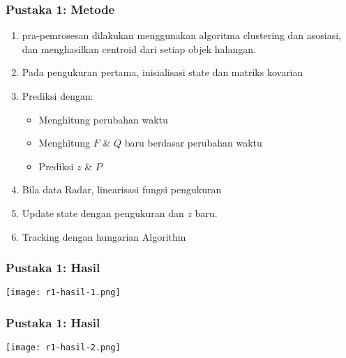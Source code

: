 \begin{frame}
    \frametitle{Pustaka 1: Metode}
    \begin{enumerate}
        \justifying
        \item pra-pemrosesan dilakukan menggunakan algoritma clustering dan asosiasi, dan menghasilkan centroid dari setiap objek halangan.
        \item Pada pengukuran pertama, inisialisasi state dan matriks kovarian 
        \item Prediksi dengan:
        \begin{itemize}
            \item Menghitung perubahan waktu
            \item Menghitung $F$ \& $Q$ baru berdasar perubahan waktu
            \item Prediksi $z$ \& $P$
        \end{itemize} 
        \item Bila data Radar, linearisasi fungsi pengukuran
        \item Update state dengan pengukuran dan $z$ baru.
        \item Tracking dengan hungarian Algorithm
    \end{enumerate}
\end{frame}


\begin{frame}
    \frametitle{Pustaka 1: Hasil}
    \centering
    \texttt{[image: r1-hasil-1.png]}
\end{frame}


\begin{frame}
    \frametitle{Pustaka 1: Hasil}
    \centering
    \texttt{[image: r1-hasil-2.png]}
\end{frame}


